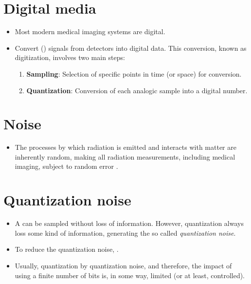 \section{Digital media}
\begin{itemize}
\item Most modern medical imaging systems are digital.
\item Convert  () signals from detectors into
  digital data. This conversion, known as digitization, involves two
  main steps:
  \begin{enumerate}
  \item \textbf{Sampling}: Selection of specific points in time (or
    space) for conversion.
  \item \textbf{Quantization}: Conversion of each analogic sample into a
    digital number.
  \end{enumerate}
\end{itemize}

\section{Noise}
\begin{itemize}
\item The processes by which radiation is emitted and interacts with
  matter are inherently random, making all radiation measurements,
  including medical imaging, subject to random error
  \cite{bushberg2011essential}.
\end{itemize}

\section{Quantization noise}
\begin{itemize}
\item A  can be sampled without
  loss of information. However, quantization always loss some kind of
  information, generating the so called \emph{quantization noise}.
\item To reduce the quantization noise,  \cite{bushberg2011essential}.
\item Usually, quantization  by quantization noise, and therefore,
  the impact of using a finite number of bits is, in some way, limited
  (or at least, controlled).
\end{itemize}
